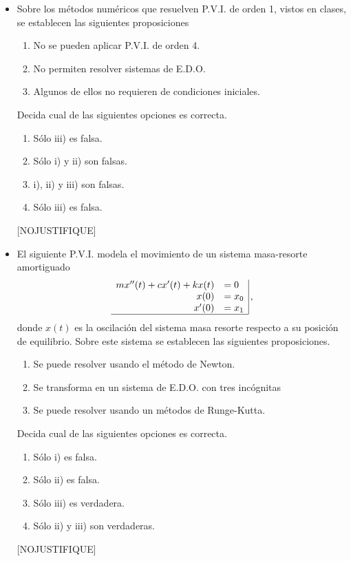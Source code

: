 \documentclass[11pt]{article}
\newcommand{\buena}{[BUENA]}
\newcommand{\nojustifique}{[NOJUSTIFIQUE]}
\begin{document}
\begin{itemize}
\item Sobre los m\'etodos num\'ericos que resuelven P.V.I. de orden 1, vistos en clases, se establecen las siguientes proposiciones
\begin{enumerate}
	\item No se pueden aplicar P.V.I. de orden 4.
    \item No permiten resolver sistemas de E.D.O.
    \item Algunos de ellos no requieren de condiciones iniciales.
\end{enumerate}
Decida cual de las siguientes opciones es correcta.
\begin{enumerate}
	\item Sólo iii) es falsa.
    \item Sólo i) y ii) son falsas.
    \item \buena  i), ii) y iii) son falsas.
    \item Sólo iii) es falsa.
\end{enumerate}
\nojustifique 

\item El siguiente P.V.I. modela el movimiento de un sistema masa-resorte amortiguado
$$
\begin{array}{rl|}
mx''(t)+cx'(t)+kx(t) 	&=0 \\
x(0) 					&=x_0\\
x'(0) 					&=x_1\\
\hline
\end{array}\,,
$$
donde $x(t)$ es la oscilaci\'on del sistema masa resorte respecto a su posici\'on de equilibrio. Sobre este sistema se establecen las siguientes proposiciones.
\begin{enumerate}
	\item Se puede resolver usando el m\'etodo de Newton.
    \item Se transforma en un sistema de E.D.O. con tres inc\'ognitas
    \item Se puede resolver usando un m\'etodos de Runge-Kutta.
\end{enumerate}
Decida cual de las siguientes opciones es correcta.
\begin{enumerate}
	\item Sólo i) es falsa.
    \item S\'olo ii) es falsa.
    \item \buena S\'olo iii) es verdadera.
    \item S\'olo ii) y iii) son verdaderas.
\end{enumerate}
\nojustifique 


\end{itemize}
\end{document}
